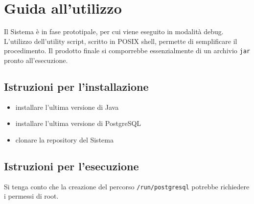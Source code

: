 %
%
%
%


\chapter{Guida all'utilizzo}\label{utilizzo}
Il Sistema è in fase prototipale, per cui viene eseguito in modalità debug. L'utilizzo dell'utility script, scritto in POSIX shell, permette di semplificare il procedimento. Il prodotto finale si comporrebbe essenzialmente di un archivio \verb!jar! pronto all'esecuzione.




\section{Istruzioni per l'installazione}
\begin{itemize}
\item installare l'ultima versione di Java
\item installare l'ultima versione di PostgreSQL
\item clonare la repository del Sistema
\end{itemize}




\section{Istruzioni per l'esecuzione}
Si tenga conto che la creazione del percorso \verb!/run/postgresql! potrebbe richiedere i permessi di root.

